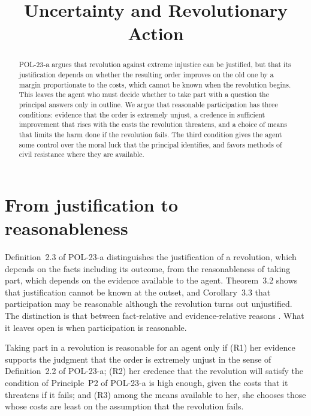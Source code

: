 \documentclass{situationist-preprint}
\title{Uncertainty and Revolutionary Action}
\begin{document}
\maketitle

\begin{abstract}
POL-23-a argues that revolution against extreme injustice can be justified, but that its justification depends on whether the resulting order improves on the old one by a margin proportionate to the costs, which cannot be known when the revolution begins. This leaves the agent who must decide whether to take part with a question the principal answers only in outline. We argue that reasonable participation has three conditions: evidence that the order is extremely unjust, a credence in sufficient improvement that rises with the costs the revolution threatens, and a choice of means that limits the harm done if the revolution fails. The third condition gives the agent some control over the moral luck that the principal identifies, and favors methods of civil resistance where they are available.
\end{abstract}

\section{From justification to reasonableness}

Definition~2.3 of POL-23-a distinguishes the justification of a revolution, which depends on the facts including its outcome, from the reasonableness of taking part, which depends on the evidence available to the agent. Theorem~3.2 shows that justification cannot be known at the outset, and Corollary~3.3 that participation may be reasonable although the revolution turns out unjustified. The distinction is that between fact-relative and evidence-relative reasons \citep{Parfit2011}. What it leaves open is when participation is reasonable.

\begin{proposition}\label{p:conditions}
Taking part in a revolution is reasonable for an agent only if (R1) her evidence supports the judgment that the order is extremely unjust in the sense of Definition~2.2 of POL-23-a; (R2) her credence that the revolution will satisfy the condition of Principle~P2 of POL-23-a is high enough, given the costs that it threatens if it fails; and (R3) among the means available to her, she chooses those whose costs are least on the assumption that the revolution fails.
\end{proposition}
\end{document}
